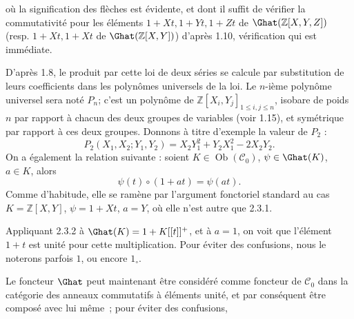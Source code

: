 où la
signification des flèches est évidente, et dont il suffit de vérifier la commutativité pour les éléments \(1+Xt,1+Yt,1+Zt\) de \(\Ghat(\mathbb Z[X,Y,Z])\) (resp. \(1+Xt,1+Xt\) de \(\Ghat(\mathbb Z[X,Y])\)) d'après 1.10, vérification qui est immédiate.

D'après 1.8, le produit par cette loi de deux séries se calcule par substitution de leurs coefficients dans les polynômes universels de la loi. Le \(n\)-ième polynôme universel sera noté \(P_n\); c'est un polynôme de \(\mathbb Z[X_i,Y_j]_{1\leq i,j\leq n}\), isobare de poids \(n\) par rapport à chacun des deux groupes de variables (voir 1.15), et symétrique par rapport à ces deux groupes. Donnons à titre d'exemple la valeur de \(P_2\) :
\[
  P_2(X_1,X_2;Y_1,Y_2)=X_2Y_1^2+Y_2X_1^2-2X_2Y_2.
\]
On a également la relation suivante : soient \(K\in\operatorname{Ob}(\mathcal C_0)\), \(\psi\in\Ghat(K)\), \(a\in K\), alors
\begin{equation}\tag{2.3.2}
  \psi(t)\circ(1+at)=\psi(at).
\end{equation}
Comme d'habitude, elle se ramène par l'argument fonctoriel standard au cas \(K=\mathbb Z[X,Y]\), \(\psi=1+Xt\), \(a=Y\), où elle n'est autre que 2.3.1.

Appliquant 2.3.2 à \(\Ghat(K)=1+K[[t]]^+\), et à \(a=1\), on voit que l'élément \(1+t\) est unité pour cette multiplication. Pour éviter des confusions, nous le noterons parfois \(1\), ou encore \(1_\circ\).

Le foncteur \(\Ghat\) peut maintenant être considéré comme foncteur de \(\mathcal C_0\) dans la catégorie des anneaux commutatifs à éléments unité, et par conséquent être composé avec lui même~; pour éviter des confusions,
